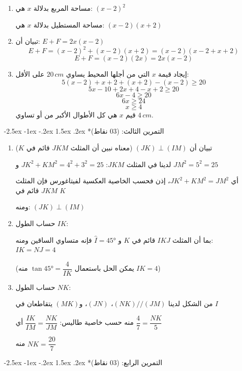\documentclass[12pt,a4paper]{article}
\makeatletter
\renewcommand\section{\@startsection{section}{1}{\z@}%
  {-2.5ex \@plus -1ex \@minus -.2ex}%
  {1.5ex \@plus.2ex}%
  {\normalfont\large\bfseries}}
\makeatother
\begin{document}
\begin{enumerate}
\item مساحة المربع بدلالة $x$ هي: $(x-2)^2$

مساحة المستطيل بدلالة $x$ هي: $(x-2)(x+2)$

\item تبيان أن: $E + F = 2x(x-2)$
\[
E + F = (x-2)^2 + (x-2)(x+2) = (x-2)(x-2+x+2)
\]
\[
E + F = (x-2)(2x) = 2x(x-2)
\]

\item إيجاد قيمة $x$ التي من أجلها المحيط يساوي $20\,cm$ على الأقل:
\[
5(x-2) + x + 2 + (x+2) - (x-2) \geq 20
\]
\[
5x - 10 + 2x + 4 - x + 2 \geq 20
\]
\[
6x - 4 \geq 20
\]
\[
6x \geq 24
\]
\[
x \geq 4
\]
قيم $x$ هي كل الأطوال الأكبر من أو تساوي $4\,cm$.
\end{enumerate}

\section*{التمرين الثالث: (03 نقاط)}

\begin{enumerate}
\item تبيان أن $(JK) \perp (IM)$ (معناه نبين أن المثلث $JKM$ قائم في $K$)

لدينا في المثلث $JKM$: $JK^2 + KM^2 = 4^2 + 3^2 = 25$ و $JM^2 = 5^2 = 25$

أي $JK^2 + KM^2 = JM^2$، إذن فحسب الخاصية العكسية لفيتاغورس فإن المثلث $JKM$ قائم في $K$

ومنه: $(JK) \perp (IM)$

\item حساب الطول $IK$:

بما أن المثلث $IKJ$ قائم في $K$ و $\hat{I} = 45°$ فإنه متساوي الساقين ومنه: $IK = NJ = 4$

(يمكن الحل باستعمال $\tan 45° = \dfrac{4}{IK}$ منه $IK = 4$)

\item حساب الطول $NK$:

من الشكل لدينا $(NK) // (JM)$، $(JN)$، و$(MK)$ يتقاطعان في $I$

منه حسب خاصية طاليس: $\dfrac{IK}{IM} = \dfrac{NK}{JM}$ أي $\dfrac{4}{7} = \dfrac{NK}{5}$

منه $NK = \dfrac{20}{7}$
\end{enumerate}

\section*{التمرين الرابع: (03 نقاط)}
\end{document}
